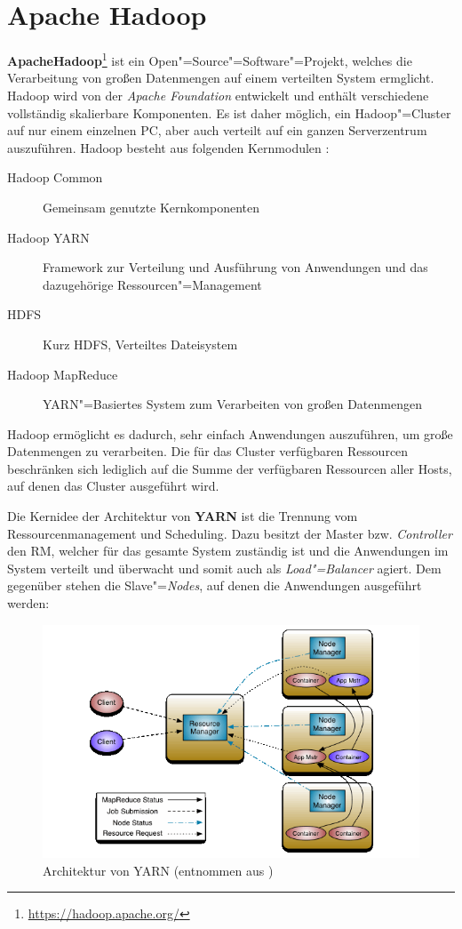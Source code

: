 \section{Apache Hadoop}\label{sec:hadoop}

\textbf{Apache\texttrademark Hadoop\textregistered}\footnote{\url{https://hadoop.apache.org/}} ist ein Open"=Source"=Software"=Projekt, welches die Verarbeitung von großen Datenmengen auf einem verteilten System ermglicht.
Hadoop wird von der \emph{Apache Foundation} entwickelt und enthält verschiedene vollständig skalierbare Komponenten.
Es ist daher möglich, ein Hadoop"=Cluster auf nur einem einzelnen PC, aber auch verteilt auf ein ganzen Serverzentrum auszuführen.
Hadoop besteht aus folgenden Kernmodulen \cite{HadoopHomePage}:

\begin{description}
	\item[Hadoop Common] Gemeinsam genutzte Kernkomponenten
	\item[Hadoop YARN] Framework zur Verteilung und Ausführung von Anwendungen und das dazugehörige Ressourcen"=Management
	\item[\acl{HDFS}] Kurz \acs{HDFS}, Verteiltes Dateisystem
	\item[Hadoop MapReduce] YARN"=Basiertes System zum Verarbeiten von großen Datenmengen
\end{description}

Hadoop ermöglicht es dadurch, sehr einfach Anwendungen auszuführen, um große Datenmengen zu verarbeiten.
Die für das Cluster verfügbaren Ressourcen beschränken sich lediglich auf die Summe der verfügbaren Ressourcen aller Hosts, auf denen das Cluster ausgeführt wird.

Die Kernidee der Architektur von \textbf{YARN} ist die Trennung vom Ressourcenmanagement und Scheduling.
Dazu besitzt der Master bzw. \emph{Controller} den \ac{RM}, welcher für das gesamte System zuständig ist und die Anwendungen im System verteilt und überwacht und somit auch als \emph{Load"=Balancer} agiert.
Dem gegenüber stehen die Slave"=\emph{Nodes}, auf denen die Anwendungen ausgeführt werden:

\begin{figure}[h]
    \includegraphics{./images/yarn_architecture.png}
    \caption[Architektur von YARN]
    {Architektur von YARN (entnommen aus \cite{HadoopYarnArch271})}
    \label{fig:yarnarch}
\end{figure}


